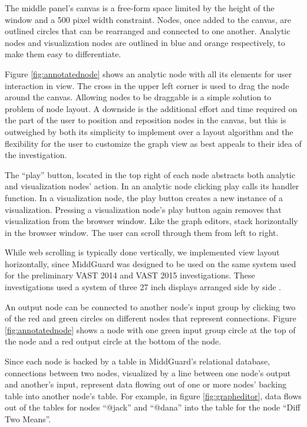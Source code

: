 \documentclass[midd]{thesis}
\begin{document}
The middle panel's canvas is a free-form space limited by the height of the
window and a 500 pixel width constraint. Nodes, once added to the canvas, are
outlined circles that can be rearranged and connected to one another. Analytic
nodes and visualization nodes are outlined in blue and orange respectively, to
make them easy to differentiate.

Figure \ref{fig:annotatednode} shows an analytic node with all its elements for
user interaction in view. The cross in the upper left corner is used to drag the
node around the canvas. Allowing nodes to be draggable is a simple solution to
problem of node layout. A downside is the additional effort and time required on
the part of the user to position and reposition nodes in the canvas, but this is
outweighed by both its simplicity to implement over a layout algorithm and the
flexibility for the user to customize the graph view as best appeals to their
idea of the investigation.

The ``play'' button, located in the top right of each node abstracts both
analytic and visualization nodes' action. In an analytic node clicking play
calls its handler function. In a visualization node, the play button creates a
new instance of a visualization. Pressing a visualization node's play button
again removes that visualization from the browser window. Like the graph
editors, stack horizontally in the browser window. The user can scroll through
them from left to right.

While web scrolling is typically done vertically, we implemented view layout
horizontally, since MiddGuard was designed to be used on the same system used
for the preliminary VAST 2014 and VAST 2015 investigations. These investigations
used a system of three 27 inch displays arranged side by side
\cite{middguard-dinofunworld}.



An output node can be connected to another node's input group by clicking two of
the red and green circles on different nodes that represent connections. Figure
\ref{fig:annotatednode} shows a node with one green input group circle at the
top of the node and a red output circle at the bottom of the node.

Since each node is backed by a table in MiddGuard's relational database,
connections between two nodes, visualized by a line between one node's output
and another's input, represent data flowing out of one or more nodes' backing
table into another node's table. For example, in figure \ref{fig:grapheditor},
data flows out of the tables for nodes ``@jack'' and ``@dana'' into the table
for the node ``Diff Two Means''.
\end{document}
